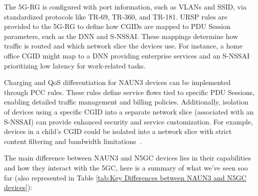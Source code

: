 The \ac{5G-RG} is configured with port information, such as \acp{VLAN} and \ac{SSID}, via standardized protocols like TR-69, TR-360, and TR-181. \ac{URSP} rules are provided to the \ac{5G-RG} to define how \acp{CGID} are mapped to \ac{PDU} Session parameters, such as the \ac{DNN} and \ac{S-NSSAI}. These mappings determine how traffic is routed and which network slice the devices use. For instance, a home office \ac{CGID} might map to a \ac{DNN} providing enterprise services and an \ac{S-NSSAI} prioritizing low latency for work-related tasks.

Charging and \ac{QoS} differentiation for \ac{NAUN3} devices can be implemented through \ac{PCC} rules. These rules define service flows tied to specific \ac{PDU} Sessions, enabling detailed traffic management and billing policies. Additionally, isolation of devices using a specific \ac{CGID} into a separate network slice (associated with an \ac{S-NSSAI}) can provide enhanced security and service customization. For example, devices in a child’s \ac{CGID} could be isolated into a network slice with strict content filtering and bandwidth limitations~\cite{23.316-p27}.

The main difference between \ac{NAUN3} and \ac{N5GC} devices lies in their capabilities and how they interact with the \ac{5GC}, here is a summary of what we've seen soo far (also represented in Table \ref{tab:Key Differences between NAUN3 and N5GC devices}):

